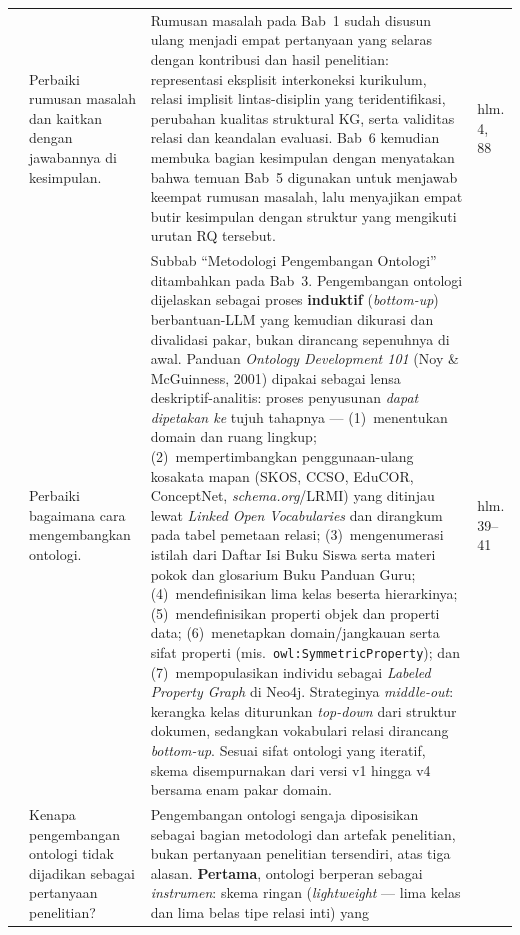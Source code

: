 \documentclass[12pt, a4paper]{article}
\begin{document}
\begin{longtable}{|
  >{\centering\arraybackslash}p{\revisionNoCol}|
  p{\revisionNoteCol}|
  p{\revisionResultCol}|
  >{\centering\arraybackslash}p{\revisionPageCol}|}
\multicolumn{4}{|p{\revisionFooterCol}|}{\textbf{Penguji 2 — Iis Afriyanti, S.Kom., M.Sc.}} \\
\hline
8 & Perbaiki rumusan masalah dan kaitkan dengan jawabannya di kesimpulan. &
Rumusan masalah pada Bab~1 sudah disusun ulang menjadi empat pertanyaan yang
selaras dengan kontribusi dan hasil penelitian: representasi eksplisit
interkoneksi kurikulum, relasi implisit lintas-disiplin yang teridentifikasi,
perubahan kualitas struktural KG, serta validitas relasi dan keandalan evaluasi.
Bab~6 kemudian membuka bagian kesimpulan dengan menyatakan bahwa temuan Bab~5
digunakan untuk menjawab keempat rumusan masalah, lalu menyajikan empat butir
kesimpulan dengan struktur yang mengikuti urutan RQ tersebut. &
hlm. 4, 88 \\
\hline
9 & Perbaiki bagaimana cara mengembangkan ontologi. &
Subbab ``Metodologi Pengembangan Ontologi'' ditambahkan pada Bab~3.
Pengembangan ontologi dijelaskan sebagai proses \textbf{induktif}
(\textit{bottom-up}) berbantuan-LLM yang kemudian dikurasi dan divalidasi
pakar, bukan dirancang sepenuhnya di awal. Panduan \textit{Ontology
Development 101} (Noy \& McGuinness, 2001) dipakai sebagai lensa
deskriptif-analitis: proses penyusunan \textit{dapat dipetakan ke} tujuh
tahapnya --- (1)~menentukan domain dan ruang lingkup; (2)~mempertimbangkan
penggunaan-ulang kosakata mapan (SKOS, CCSO, EduCOR, ConceptNet,
\textit{schema.org}/LRMI) yang ditinjau lewat \textit{Linked Open
Vocabularies} dan dirangkum pada tabel pemetaan relasi; (3)~mengenumerasi
istilah dari Daftar Isi Buku Siswa serta materi pokok dan glosarium Buku
Panduan Guru; (4)~mendefinisikan lima kelas beserta hierarkinya;
(5)~mendefinisikan properti objek dan properti data; (6)~menetapkan
domain/jangkauan serta sifat properti (mis.\ \texttt{owl:SymmetricProperty});
dan (7)~mempopulasikan individu sebagai \textit{Labeled Property Graph} di
Neo4j. Strateginya \textit{middle-out}: kerangka kelas diturunkan
\textit{top-down} dari struktur dokumen, sedangkan vokabulari relasi dirancang
\textit{bottom-up}. Sesuai sifat ontologi yang iteratif, skema disempurnakan
dari versi v1 hingga v4 bersama enam pakar domain. &
hlm. 39--41 \\
\hline
10 & Kenapa pengembangan ontologi tidak dijadikan sebagai pertanyaan
penelitian? &
Pengembangan ontologi sengaja diposisikan sebagai bagian metodologi dan
artefak penelitian, bukan pertanyaan penelitian tersendiri, atas tiga alasan.
\textbf{Pertama}, ontologi berperan sebagai \textit{instrumen}: skema ringan
(\textit{lightweight} --- lima kelas dan lima belas tipe relasi inti) yang

\end{longtable}
\end{document}
